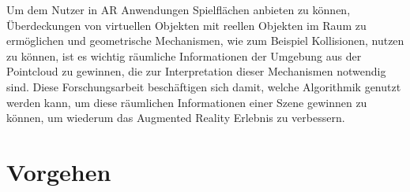 Um dem Nutzer in AR Anwendungen Spielflächen anbieten zu können, Überdeckungen von virtuellen Objekten mit reellen Objekten im Raum zu ermöglichen und geometrische Mechanismen, wie zum Beispiel Kollisionen, nutzen zu können, ist es wichtig räumliche Informationen der Umgebung aus der Pointcloud zu gewinnen, die zur Interpretation dieser Mechanismen notwendig sind. Diese Forschungsarbeit beschäftigen sich damit, welche Algorithmik genutzt werden kann, um diese räumlichen Informationen einer Szene gewinnen zu können, um wiederum das Augmented Reality Erlebnis zu verbessern.\\






\section{Vorgehen}